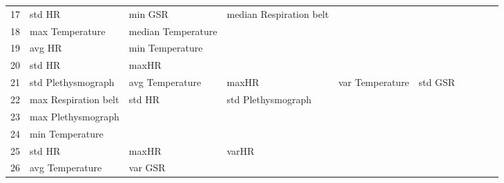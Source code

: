 \begin{landscape}
\begin{table}[]
\begin{tabular}{l|llllllll}
17       & std HR                  & min GSR               & median Respiration belt &                         &                         &                       &                      &          &                      &        \\
18       & max Temperature         & median Temperature    &                         &                         &                         &                       &                      &          &                      &        \\
19       & avg HR                  & min Temperature       &                         &                         &                         &                       &                      &          &                      &        \\
20       & std HR                  & maxHR                 &                         &                         &                         &                       &                      &          &                      &        \\
21       & std Plethysmograph      & avg Temperature       & maxHR                   & var Temperature         & std GSR                 &                       &                      &          &                      &        \\
22       & max Respiration belt    & std HR                & std Plethysmograph      &                         &                         &                       &                      &          &                      &        \\
23       & max Plethysmograph      &                       &                         &                         &                         &                       &                      &          &                      &        \\
24       & min Temperature         &                       &                         &                         &                         &                       &                      &          &                      &        \\
25       & std HR                  & maxHR                 & varHR                   &                         &                         &                       &                      &          &                      &        \\
26       & avg Temperature         & var GSR               &                         &                         &                         &                       &                      &          &                      &        \\

\end{tabular}
\end{table}
\end{landscape}
